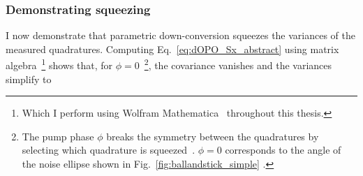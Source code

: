 \subsubsection{Demonstrating squeezing}

I now demonstrate that parametric down-conversion squeezes the variances of the measured quadratures.
Computing Eq.~\ref{eq:dOPO_Sx_abstract} using matrix algebra~\footnote{Which I perform using Wolfram Mathematica~\cite{} throughout this thesis.} shows that, for $\phi=0$~\footnote{The pump phase $\phi$ breaks the symmetry between the quadratures by selecting which quadrature is squeezed~\cite{}. $\phi=0$ corresponds to the angle of the noise ellipse shown in Fig.~\ref{fig:ballandstick_simple} .}, the covariance vanishes and the variances simplify to~\cite{} 
